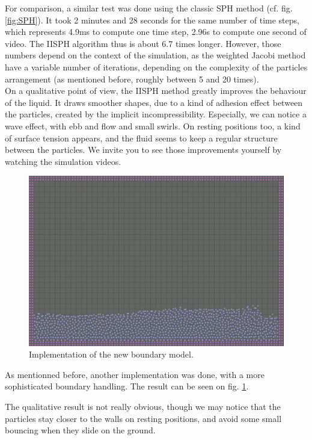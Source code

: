 \documentclass[acmtog, authorversion]{acmart}
\begin{document}
For comparison, a similar test was done using the classic SPH method (cf. fig. \ref{fig:SPH}).
It took 2 minutes and 28 seconds for the same number of time steps, which represents 4.9ms to compute one time step, 2.96s to compute one second of video.
The IISPH algorithm thus is about 6.7 times longer.
However, those numbers depend on the context of the simulation, as the weighted Jacobi method have a variable number of iterations, depending on the complexity of the particles arrangement (as mentioned before, roughly between 5 and 20 times).\\

On a qualitative point of view, the IISPH method greatly improves the behaviour of the liquid. It draws smoother shapes, due to a kind of adhesion effect between the particles, created by the implicit incompressibility.
Especially, we can notice a wave effect, with ebb and flow and small swirls.
On resting positions too, a kind of surface tension appears, and the fluid seems to keep a regular structure between the particles.
We invite you to see those improvements yourself by watching the simulation videos.\\


\begin{figure}
  \centering
  \includegraphics[width=\linewidth]{Boundary.png}
  \caption{Implementation of the new  boundary model.}
  \label{fig:boundary}
\end{figure}


As mentionned before, another implementation was done, with a more sophisticated boundary handling. The result can be seen on fig. \ref{fig:boundary}.

The qualitative result is not really obvious, though we may notice that the particles stay closer to the walls on resting positions, and avoid some small bouncing when they slide on the ground.
\end{document}
